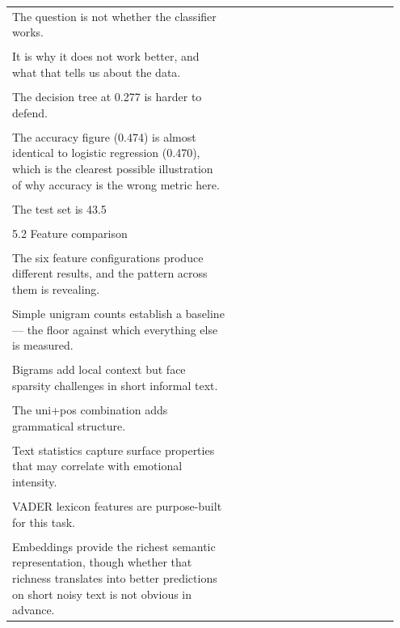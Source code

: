 \documentclass[11pt]{article}
\begin{document}
\begin{longtable}{|p{0.55\linewidth}|p{0.40\linewidth}|}
\hline
\rule{0pt}{3.5cm} & \\
\hline
The question is not whether the classifier works. & \\[2pt]
\hline
\rule{0pt}{3.5cm} & \\
\hline
It is why it does not work better, and what that tells us about the data. & \\[2pt]
\hline
\rule{0pt}{3.5cm} & \\
\hline
The decision tree at 0.277 is harder to defend. & \\[2pt]
\hline
\rule{0pt}{3.5cm} & \\
\hline
The accuracy figure (0.474) is almost identical to logistic regression (0.470), which is the clearest possible illustration of why accuracy is the wrong metric here. & \\[2pt]
\hline
\rule{0pt}{3.5cm} & \\
\hline
The test set is 43.5 & \\[2pt]
\hline
\rule{0pt}{3.5cm} & \\
\hline
5.2 Feature comparison & \\[2pt]
\hline
\rule{0pt}{3.5cm} & \\
\hline
The six feature configurations produce different results, and the pattern across them is revealing. & \\[2pt]
\hline
\rule{0pt}{3.5cm} & \\
\hline
Simple unigram counts establish a baseline --- the floor against which everything else is measured. & \\[2pt]
\hline
\rule{0pt}{3.5cm} & \\
\hline
Bigrams add local context but face sparsity challenges in short informal text. & \\[2pt]
\hline
\rule{0pt}{3.5cm} & \\
\hline
The uni+pos combination adds grammatical structure. & \\[2pt]
\hline
\rule{0pt}{3.5cm} & \\
\hline
Text statistics capture surface properties that may correlate with emotional intensity. & \\[2pt]
\hline
\rule{0pt}{3.5cm} & \\
\hline
VADER lexicon features are purpose-built for this task. & \\[2pt]
\hline
\rule{0pt}{3.5cm} & \\
\hline
Embeddings provide the richest semantic representation, though whether that richness translates into better predictions on short noisy text is not obvious in advance. & \\[2pt]

\end{longtable}
\end{document}
